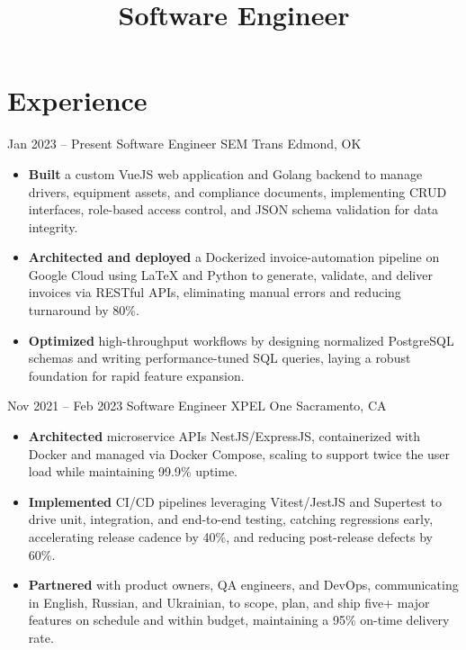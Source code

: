 \documentclass[11pt]{moderncv}
\title{Software Engineer}
\begin{document}
    \makecvtitle
\vspace*{-3em}
\section{Experience}

\cventry
    {Jan 2023 -- Present}
    {Software Engineer}
    {SEM Trans}
    {Edmond, OK}
    {}
    {%
        \begin{itemize}%
            \item \textbf{Built} a custom VueJS web application and Golang
            backend to manage drivers, equipment assets, and compliance
            documents, implementing CRUD interfaces, role-based access control,
            and JSON schema validation for data integrity.%
            \item \textbf{Architected and deployed} a Dockerized
            invoice-automation pipeline on Google Cloud using {\LaTeX} and
            Python to generate, validate, and deliver invoices via RESTful APIs,
            eliminating manual errors and reducing turnaround by 80\%.%
            \item \textbf{Optimized} high-throughput workflows by designing
            normalized PostgreSQL schemas and writing performance-tuned SQL
            queries, laying a robust foundation for rapid feature expansion.
        \end{itemize}%
    }

\cventry
    {Nov 2021 -- Feb 2023}
    {Software Engineer}
    {XPEL One}
    {Sacramento, CA}
    {}
    {%
        \begin{itemize}%
            \item \textbf{Architected} microservice APIs NestJS/ExpressJS,
            containerized with Docker and managed via Docker Compose, scaling to
            support twice the user load while maintaining 99.9\% uptime.%
            \item \textbf{Implemented} CI/CD pipelines leveraging Vitest/JestJS
            and Supertest to drive unit, integration, and end-to-end
            testing, catching regressions early, accelerating release cadence by
            40\%, and reducing post-release defects by 60\%.%
            \item \textbf{Partnered} with product owners, QA engineers, and
            DevOps, communicating in English, Russian, and Ukrainian, to scope,
            plan, and ship five+ major features on schedule and within budget,
            maintaining a 95\% on-time delivery rate.
        \end{itemize}%
    }
\end{document}
